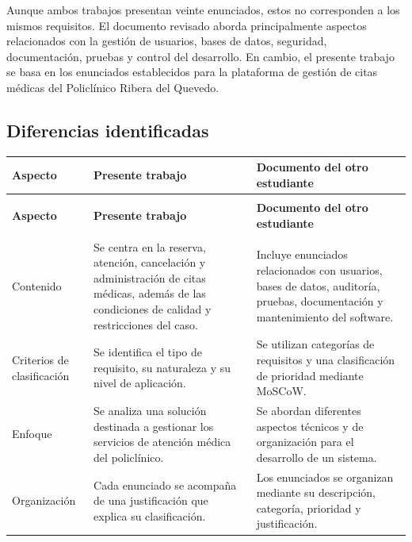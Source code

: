 \documentclass[12pt,a4paper]{article}
\begin{document}
Aunque ambos trabajos presentan veinte enunciados, estos
no corresponden a los mismos requisitos. El documento
revisado aborda principalmente aspectos relacionados con
la gestión de usuarios, bases de datos, seguridad,
documentación, pruebas y control del desarrollo. En cambio,
el presente trabajo se basa en los enunciados establecidos
para la plataforma de gestión de citas médicas del
Policlínico Ribera del Quevedo.

\subsection{Diferencias identificadas}

\begin{longtable}{@{}
    >{\raggedright\arraybackslash}p{2.8cm}
    >{\raggedright\arraybackslash}p{5.3cm}
    >{\raggedright\arraybackslash}p{5.3cm}
@{}}
\toprule
\rowcolor{azulTabla}
\color{white}\textbf{Aspecto} &
\color{white}\textbf{Presente trabajo} &
\color{white}\textbf{Documento del otro estudiante} \\
\midrule
\endfirsthead

\multicolumn{3}{c}{\small\textit{Continuación de la tabla anterior}}\\
\toprule
\rowcolor{azulTabla}
\color{white}\textbf{Aspecto} &
\color{white}\textbf{Presente trabajo} &
\color{white}\textbf{Documento del otro estudiante} \\
\midrule
\endhead

\midrule
\multicolumn{3}{r}{\small\textit{Continúa en la siguiente página}}\\
\endfoot

\bottomrule
\endlastfoot

\rowcolors{2}{azulClaroTabla}{white}

Contenido &
Se centra en la reserva, atención, cancelación y
administración de citas médicas, además de las
condiciones de calidad y restricciones del caso. &
Incluye enunciados relacionados con usuarios, bases
de datos, auditoría, pruebas, documentación y
mantenimiento del software. \\
\hline

Criterios de clasificación &
Se identifica el tipo de requisito, su naturaleza
y su nivel de aplicación. &
Se utilizan categorías de requisitos y una
clasificación de prioridad mediante MoSCoW. \\
\hline

Enfoque &
Se analiza una solución destinada a gestionar los
servicios de atención médica del policlínico. &
Se abordan diferentes aspectos técnicos y de
organización para el desarrollo de un sistema. \\
\hline

Organización &
Cada enunciado se acompaña de una justificación
que explica su clasificación. &
Los enunciados se organizan mediante su descripción,
categoría, prioridad y justificación. \\
\hline
\end{longtable}
\end{document}
